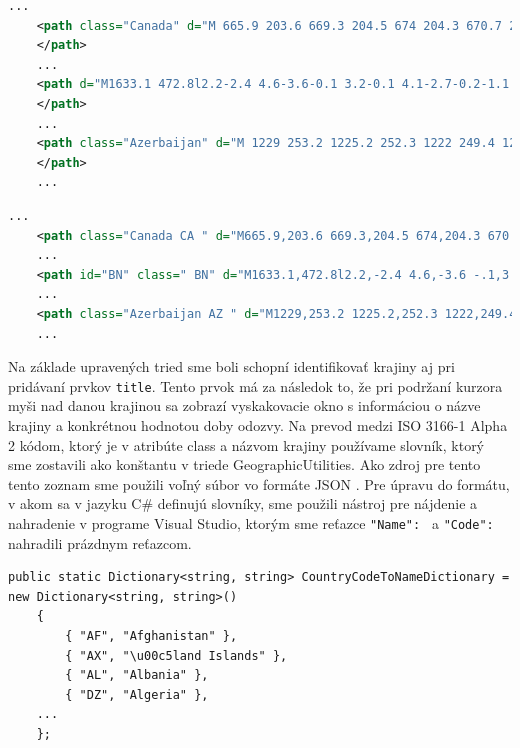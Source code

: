 \begin{lstlisting}[language={XML},caption={Ukážka kódu neupravenej SVG mapy.},label=alg:map_orig]
    ...
    <path class="Canada" d="M 665.9 203.6 669.3 204.5 674 204.3 670.7 206.9 668.7 207.3 663.2 204.6 662.6 202.5 665.1 200.6 665.9 203.6 Z">
    </path>
    ...
    <path d="M1633.1 472.8l2.2-2.4 4.6-3.6-0.1 3.2-0.1 4.1-2.7-0.2-1.1 2.2-2.8-3.3z" id="BN" name="Brunei Darussalam">
    </path>
    ...
    <path class="Azerbaijan" d="M 1229 253.2 1225.2 252.3 1222 249.4 1220.8 246.9 1221.8 246.8 1223.7 248.5 1226 248.5 1226.2 249.5 1229 253.2 Z">
    </path>
    ...
\end{lstlisting}

\begin{lstlisting}[language={XML},caption={Ukážka kódu upravenej SVG mapy.},label=alg:map_edited]
    ...
    <path class="Canada CA " d="M665.9,203.6 669.3,204.5 674,204.3 670.7,206.9 668.7,207.3 663.2,204.6 662.6,202.5 665.1,200.6 665.9,203.6Z"/>
    ...
    <path id="BN" class=" BN" d="M1633.1,472.8l2.2,-2.4 4.6,-3.6 -.1,3.2 -.1,4.1 -2.7,-.2 -1.1,2.2 -2.8,-3.3z" name="Brunei Darussalam"/>
    ...
    <path class="Azerbaijan AZ " d="M1229,253.2 1225.2,252.3 1222,249.4 1220.8,246.9 1221.8,246.8 1223.7,248.5H1226L1226.2,249.5 1229,253.2Z"/>
    ...
\end{lstlisting}


Na základe upravených tried sme boli schopní identifikovať krajiny aj pri pridávaní prvkov \lstinline{title}. Tento prvok má za následok to, že pri podržaní 
kurzora myši nad danou krajinou sa zobrazí vyskakovacie okno s informáciou o názve krajiny a konkrétnou hodnotou doby odozvy. Na prevod medzi ISO 3166-1 Alpha 2 kódom, 
ktorý je v atribúte class a názvom krajiny používame slovník, ktorý sme zostavili ako konštantu v triede GeographicUtilities. Ako zdroj pre tento tento zoznam 
sme použili voľný súbor vo formáte JSON \cite{country_codes}. Pre úpravu do formátu, v akom sa v jazyku C\# definujú slovníky, sme použili nástroj pre nájdenie 
a nahradenie v programe Visual Studio, ktorým sme reťazce \lstinline{"Name": } a \lstinline{"Code": } nahradili prázdnym reťazcom. 

\begin{lstlisting}[language={[Sharp]C},caption={Ukážka kódu CountryCodeToNameDictionary},label=alg:country_code_to_country_dict]
    public static Dictionary<string, string> CountryCodeToNameDictionary = new Dictionary<string, string>()
    {
        { "AF", "Afghanistan" },
        { "AX", "\u00c5land Islands" },
        { "AL", "Albania" },
        { "DZ", "Algeria" },
    ...
    };
\end{lstlisting}